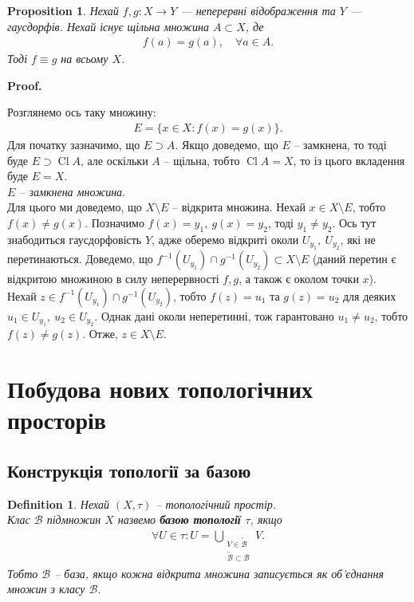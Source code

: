 \documentclass[a4paper, 10pt]{article}
\makeatletter
\theoremstyle{theoremdd}
\newtheorem{definition}[theorem]{Definition}
\newtheorem{proposition}[theorem]{Proposition}
\DeclareMathOperator{\Cl}{Cl}
\renewenvironment{proof}[1][Proof.\\]{\par
\pushQED{\hfill \qed}%
\normalfont \topsep6\p@\@plus6\p@\relax
\trivlist
\item\relax
{\bfseries
#1\@addpunct{.}}\hspace\labelsep\ignorespaces
}{%
\popQED\endtrivlist\@endpefalse
}
\makeatother
\begin{document}
\begin{proposition}
Нехай $f,g \colon X \to Y$ --- неперервні відображення та $Y$ --- гаусдорфів. Нехай існує щільна множина $A \subset X$, де
\begin{align*}
f(a) = g(a),\quad \forall a \in A.
\end{align*}
Тоді $f \equiv g$ на всьому $X$. 
\end{proposition}

\begin{proof}
Розглянемо ось таку множину:
\begin{align*}
E = \{x \in X: f(x) = g(x) \}.
\end{align*}
Для початку зазначимо, що $E \supset A$. Якщо доведемо, що $E$ -- замкнена, то тоді буде $E \supset \Cl A$, але оскільки $A$ -- щільна, тобто $\Cl A = X$, то із цього вкладення буде $E = X$.
\bigskip \\
\textit{$E$ -- замкнена множина}.\\
Для цього ми доведемо, що $X \setminus E$ -- відкрита множина. Нехай $x \in X \setminus E$, тобто $f(x) \neq g(x)$. Позначимо $f(x) = y_1,\ g(x) = y_2$, тоді $y_1 \neq y_2$. Ось тут знабодиться гаусдорфовість $Y$, адже оберемо відкриті околи $U_{y_1},\ U_{y_2}$, які не перетинаються. Доведемо, що $f^{-1}(U_{y_1}) \cap g^{-1}(U_{y_2}) \subset X \setminus E$ (даний перетин є відкритою множиною в силу неперервності $f,g$, а також є околом точки $x$).\\
Нехай $z \in f^{-1}(U_{y_1}) \cap g^{-1}(U_{y_2})$, тобто $f(z) = u_1$ та $g(z) = u_2$ для деяких $u_1 \in U_{y_1},\ u_2 \in U_{y_2}$. Однак дані околи неперетинні, тож гарантовано $u_1 \neq u_2$, тобто $f(z) \neq g(z)$. Отже, $z \in X \setminus E$.
\end{proof}
\newpage

\section{Побудова нових топологічних просторів}
\subsection{Конструкція топології за базою}
\begin{definition}
Нехай $(X,\tau)$ -- топологічний простір.\\
Клас $\mathcal{B}$ підмножин $X$ назвемо \textbf{базою топології $\tau$}, якщо
\begin{align*}
\forall U \in \tau: U = \bigcup_{\substack{V \in \mathcal{\tilde{B}}  \\ \mathcal{\tilde{B}} \subset \mathcal{B}}} V.
\end{align*}
Тобто $\mathcal{B}$ -- база, якщо кожна відкрита множина записується як об'єднання множин з класу $\mathcal{B}$.
\end{definition}
\end{document}
